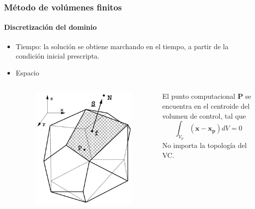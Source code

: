 \begin{frame}
    \frametitle{M\'etodo de vol\'umenes finitos}
    \framesubtitle{Discretizaci\'on del dominio}

    \begin{itemize}
        \item Tiempo: la soluci\'on se obtiene marchando en el tiempo, a partir de la condici\'on inicial prescripta.
        \item Espacio
            \begin{columns}
                       
                \begin{figure}[h]
                    \begin{center}
                        \includegraphics[scale=0.23]{Imagenes/VC_Gral}
                    \end{center}
                \end{figure} 
                                                      
                \centering               
                El punto computacional {\bf P} se encuentra en el centroide del volumen de control, tal que
                $$
                \int_{V_p} (\mathbf{x} - \mathbf{x_p})dV = 0
                $$
                No importa la topolog\'ia del VC.
                            
            \end{columns}
        
    \end{itemize}     

\end{frame}
